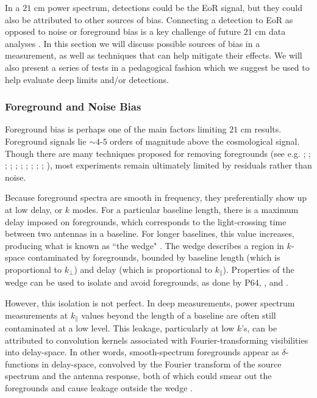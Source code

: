 \documentclass[preprint2,numberedappendix,tighten]{aastex6}  %
\begin{document}
In a $21$ cm power spectrum, detections could be the EoR signal, but they could also 
be attributed to other sources of bias. Connecting a detection to EoR as opposed to noise or foreground bias is a key challenge of 
future $21$ cm data analyses \citep[e.g.][]{petrovic_and_oh2011}. In this section we will discuss possible sources of bias in a measurement, as well as techniques 
that can help mitigate their effects. We will also present a series of tests in a pedagogical fashion which we suggest be used to 
help evaluate deep limits and/or detections.

\subsubsection{Foreground and Noise Bias}
\label{sec:BiasTypes}

Foreground bias is perhaps one of the main factors limiting $21$ cm results. Foreground signals lie $\sim4$-$5$ orders of 
magnitude above the cosmological signal. Though there are many techniques proposed for removing foregrounds (see e.g. \citealt{vedantham_et_al2012}; \citealt{parsons_et_al2012a}; \citealt{parsons_et_al2012b}; \citealt{dillon_et_al2013a}; \citealt{wang_et_al2013}; \citealt{parsons_et_al2014}; \citealt{liu_et_al2014a}; \citealt{liu_et_al2014b}; \citealt{dillon_et_al2015}; \citealt{pober_et_al2016a}; \citealt{trott_et_al2016}), most 
experiments remain ultimately limited by residuals rather than noise.

Because foreground spectra are smooth in frequency, they preferentially show up at low delay, or $k$ modes. For a particular 
baseline length, there is a maximum delay imposed on foregrounds, which corresponds to the light-crossing time between two 
antennas in a baseline. For longer baselines, this value increases, producing what is known as ``the 
wedge"
\citep{datta_et_al2010, parsons_et_al2012b, vedantham_et_al2012, pober_et_al2013, thyagarajan_et_al2013, liu_et_al2014a, liu_et_al2014b, patil_et_al2017}. 
The wedge describes a region in $k$-space contaminated by foregrounds, bounded by baseline length (which is proportional to $k_{\perp}$) and delay (which is 
proportional to $k_{\parallel}$). Properties of the wedge can be used to isolate and 
avoid foregrounds, as done by P64, 
\citet{parsons_et_al2014}, and \citet{jacobs_et_al2015}.

However, this isolation is not perfect.  In deep measurements, power spectrum measurements at $k_{\parallel}$ values beyond 
the length of a baseline are often still contaminated at a low level. This leakage, particularly at low $k$'s, can be attributed to 
convolution kernels associated with Fourier-transforming visibilities into delay-space. In other words, smooth-spectrum 
foregrounds appear as $\delta$-functions in delay-space, convolved by the Fourier transform of the source spectrum and the 
antenna response, both of which could smear out the foregrounds and cause leakage outside the wedge \citep[e.g.][]{ewall-wice_et_al2017}.
\end{document}
